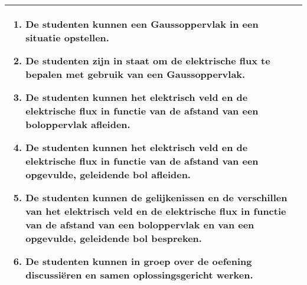 \begin{landscape}
\begin{tabularx}{1.56\textwidth}{|p{}|X|}
\begin{enumerate}[itemsep=0.08\baselineskip]
			\item De studenten kunnen een Gaussoppervlak in een situatie opstellen.
			\item De studenten zijn in staat om de elektrische flux te bepalen met gebruik van een Gaussoppervlak.
			\item De studenten kunnen het elektrisch veld en de elektrische flux  in functie van de afstand  van een boloppervlak afleiden.
			\item De studenten kunnen het elektrisch veld en de elektrische flux  in functie van de afstand van een opgevulde, geleidende bol afleiden.
			\item De studenten kunnen de gelijkenissen en de verschillen van het elektrisch veld en de elektrische flux in functie van de afstand van een boloppervlak en van een opgevulde, geleidende bol bespreken.
		    \item De studenten kunnen in groep over de oefening discussiëren en samen oplossingsgericht werken.
		\end{enumerate} \\\hline
	\end{tabularx}



\end{landscape}
